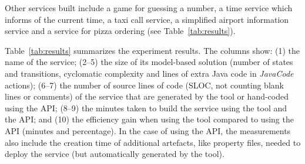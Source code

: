 
Other services built include a game for guessing a number, a time service which informs of the current time, 
a taxi call service, a simplified airport information service and a service for pizza ordering (see Table~\ref{tab:results}).

Table~\ref{tab:results} summarizes the experiment results. The columns show: (1) the name of the service;
(2--5) the size of its model-based solution (number of states and transitions, cyclomatic complexity and lines of extra 
Java code in {\em JavaCode} actions); (6--7) the number of source lines of code (SLOC, not 
counting blank lines or comments) of the service that are generated by the tool or hand-coded using the API; (8--9) 
the minutes taken to build the service using the tool and the API; and (10) the efficiency gain when using the tool 
compared to using the API (minutes and percentage). In the case of using the API, the measurements also include 
the creation time of additional artefacts, like property files, needed to deploy the service (but automatically generated by the tool).

